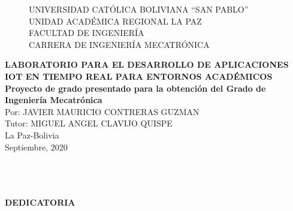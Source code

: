 \begin{center}
\begin{figure}
\centering%
\textsc{\large UNIVERSIDAD CAT\'OLICA BOLIVIANA ``SAN PABLO'' }\\[0.3cm] %
\textsc{\large UNIDAD ACAD\'EMICA REGIONAL LA PAZ}\\[0.3cm] %
\textsc{\large FACULTAD DE INGENIER\'IA}\\[0.3cm]
\textsc{\normalsize  CARRERA DE INGENIER\'IA MECATR\'ONICA}\\[0.1cm]
%
\end{figure}
\textbf{\large
LABORATORIO PARA EL DESARROLLO DE APLICACIONES IOT EN TIEMPO REAL PARA ENTORNOS ACAD\'EMICOS}\\[0.5cm]

\thispagestyle{empty} \vspace*{0.01cm} \textbf{\large Proyecto de grado presentado para la obtenci\'on del Grado de Ingenier\'ia Mecatr\'onica}\\[0.65cm]

\thispagestyle{empty} \vspace*{0.01cm} \normalsize Por: JAVIER MAURICIO CONTRERAS GUZMAN \\[0.8cm]

\thispagestyle{empty} \vspace*{0.01cm} \normalsize Tutor: MIGUEL ANGEL CLAVIJO QUISPE\\[1.5cm]

\vspace*{0.01cm} \normalsize La Paz-Bolivia\\[0.25cm]
\vspace*{0.01cm} \normalsize Septiembre, 2020
\end{center}

\newpage{\pagestyle{empty}\cleardoublepage}

\newpage

\newpage{\pagestyle{empty}\cleardoublepage}

\newpage
\thispagestyle{empty} \textbf{}\normalsize
\\\\\\%
\textbf{DEDICATORIA}\\[4.0cm]


